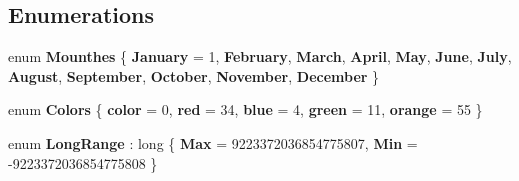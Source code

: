 \subsection*{Enumerations}
\begin{DoxyCompactItemize}
\item 
\mbox{\label{namespace_home_work_1_1_task_library_1_1_tasks_1_1_lesson2_a784ad8c75bd85299518405797bf94c16}} 
enum {\bfseries Mounthes} \{ \newline
{\bfseries January} = 1, 
{\bfseries February}, 
{\bfseries March}, 
{\bfseries April}, 
\newline
{\bfseries May}, 
{\bfseries June}, 
{\bfseries July}, 
{\bfseries August}, 
\newline
{\bfseries September}, 
{\bfseries October}, 
{\bfseries November}, 
{\bfseries December}
 \}
\item 
\mbox{\label{namespace_home_work_1_1_task_library_1_1_tasks_1_1_lesson2_a5fe680427a25a34b555fcbcf734b83c0}} 
enum {\bfseries Colors} \{ \newline
{\bfseries color} = 0, 
{\bfseries red} = 34, 
{\bfseries blue} = 4, 
{\bfseries green} = 11, 
\newline
{\bfseries orange} = 55
 \}
\item 
\mbox{\label{namespace_home_work_1_1_task_library_1_1_tasks_1_1_lesson2_aeb4748093e6887ff051487f37844b0d3}} 
enum {\bfseries Long\+Range} \+: long \{ {\bfseries Max} = 9223372036854775807, 
{\bfseries Min} = -\/9223372036854775808
 \}
\end{DoxyCompactItemize}
